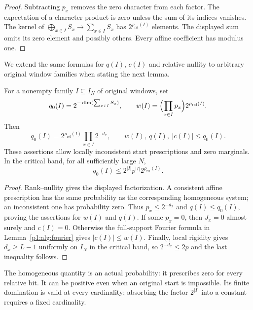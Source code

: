 \begin{proof}
Subtracting \(p_x\) removes the zero character from each
factor. The expectation of a character product is zero
unless the sum of its indices vanishes. The kernel of
\(\bigoplus_{x\in I}S_x\to\sum_{x\in I}S_x\) has
\(2^{\rho_{\mathrm{rel}}(I)}\) elements. The displayed sum omits its
zero element and possibly others. Every affine
coefficient has modulus one.
\end{proof}

We extend the same formulas for $q(I)$, $c(I)$ and relative nullity
to arbitrary original window families when stating the next lemma.

\begin{lemma}
\label{p2:homogeneous:envelope}
For a nonempty family $I\subseteq I_N$ of original windows, set
\[
 q_0(I)=2^{-\dim(\sum_{x\in I}S_x)},\qquad
 w(I)=\Bigl(\prod_{x\in I}p_x\Bigr)2^{\rho_{\mathrm{rel}}(I)}.
\]
Then
\begin{equation}
 q_0(I)=2^{\rho_{\mathrm{rel}}(I)}\prod_{x\in I}2^{-d_x},
 \qquad w(I),\ q(I),\ |c(I)|\le q_0(I).
 \label{p2:homogeneous:domination}
\end{equation}
These assertions allow locally inconsistent start prescriptions and
zero marginals. In the critical band, for all sufficiently large $N$,
\begin{equation}
 q_0(I)\le 2^{|I|}p^{|I|}2^{\rho_{\mathrm{rel}}(I)}.
 \label{p2:homogeneous:nominal}
\end{equation}
\end{lemma}

\begin{proof}
Rank--nullity gives the displayed factorization. A consistent affine
prescription has the same probability as the corresponding homogeneous
system; an inconsistent one has probability zero. Thus
$p_x\le2^{-d_x}$ and $q(I)\le q_0(I)$, proving the assertions for
$w(I)$ and $q(I)$.
If some $p_x=0$, then $J_x=0$ almost surely and $c(I)=0$.
Otherwise the full-support Fourier formula in
Lemma~\ref{p1:alg:fourier} gives $|c(I)|\le w(I)$.
Finally, local rigidity gives $d_x\ge L-1$ uniformly on $I_N$ in
the critical band, so $2^{-d_x}\le2p$ and the last inequality follows.
\end{proof}

The homogeneous quantity is an actual probability: it prescribes zero
for every relative bit. It can be positive even when an original start
is impossible. Its finite domination is valid at every cardinality;
absorbing the factor $2^{|I|}$ into a constant requires a fixed cardinality.

